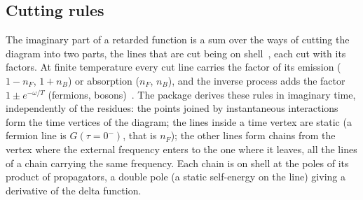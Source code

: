 \documentclass[11pt,a4paper]{article}
\begin{document}
\subsection{Cutting rules}\label{sec:cutting}

The imaginary part of a retarded function is a sum over the ways of cutting the diagram into two parts, the lines that
are cut being on shell~\cite{Cutkosky1960}, each cut with its factors. At finite temperature every cut line carries the factor of its emission
($1-n_F$, $1+n_B$) or absorption ($n_F$, $n_B$), and the inverse process adds the factor $1\pm e^{-\omega/T}$
(fermions, bosons)~\cite{Weldon1983,KobesSemenoff1985,KobesSemenoff1986,LandsmanVanWeert1987,LeBellac1996,KapustaGale2006}.
The package derives these rules in imaginary time, independently of the residues: the points joined by instantaneous
interactions form the time vertices of the diagram; the lines inside a time vertex are static (a fermion line is
$G(\tau=0^-)$, that is $n_F$); the other lines form chains from the vertex where the external frequency enters to the one
where it leaves, all the lines of a chain carrying the same frequency. Each chain is on shell at the poles of its
product of propagators, a double pole (a static self-energy on the line) giving a derivative of the delta function.
\end{document}
